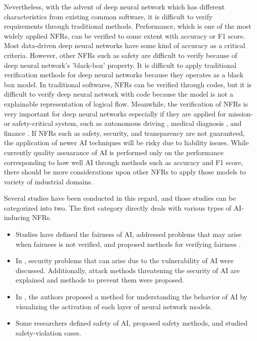 \documentclass[symmetry,article,submit,moreauthors,pdftex]{Definitions/mdpi}
\begin{document}
Nevertheless, with the advent of deep neural network which has different characteristics from existing common software, it is difficult to verify requirements through traditional methods. 
Performance, which is one of the most widely applied NFRs, can be verified to some extent with accuracy or F1 score. Most data-driven deep neural networks have some kind of accuracy as a critical criteria. However, other NFRs such as safety are difficult to verify because of deep neural network's 'black-box' property.
It is difficult to apply traditional verification methods for deep neural networks because they operates as a black box model. In traditional softwares, NFRs can be verified through codes, but it is difficult to verify deep neural network with code because the model is not a explainable representation of logical flow.
Meanwhile, the verification of NFRs is very important for deep neural networks especially if they are applied for mission- or safety-critical system, such as autonomous driving \cite{ai-driving-bajarski,ai-driving-levinson}, medical diagnosis \cite{ai-medical-ramsundar,ai-medical-vieira,ai-medical-xai-holzinger,ai-medical-krause,ai-medical-tan,ai-medical-pesapane,ai-medical-miller}, and finance \cite{ai-finance-fu}.
If NFRs such as safety, security, and transparency are not guaranteed, the application of newer AI techniques will be risky due to liability issues. 
While currently quality assuarance of AI is performed only on the performance corresponding to how well AI through methods such as accuracy and F1 score, there should be more considerations upon other NFRs to apply those models to variety of industrial domains.

Several studies have been conducted in this regard, and those studies can be categorized into two.
The first category directly deals with various types of AI-inducing NFRs.


\begin{itemize}
    \item Studies have defined the fairness of AI, addressed problems that may arise when fairness is not verified, and proposed methods for verifying fairness \cite{fairness-dwork, fairness-feldman, fairness-tramer, fairness-zhang, fairness-zemel}.
    \item In \cite{security-barreno,security-mei,security-mei2}, security problems that can arise due to the vulnerability of AI were discussed. Additionally, attack methods threatening the security of AI are explained and methods to prevent them were proposed.
    \item In \cite{transparency-yosinski}, the authors proposed a method for understanding the behavior of AI by visualizing the activation of each layer of neural network models.
    \item Some researchers \cite{safety-amodei,safety-juric,safety-leike} defined safety of AI, proposed safety methods, and studied safety-violation cases.
\end{itemize}
\end{document}
